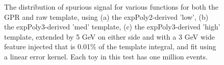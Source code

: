 \begin{figure} 
\begin{center}

\caption{The distribution of spurious signal for various functions for both the GPR and raw template, using (a) the expPoly2-derived 'low', (b) the expPoly3-derived 'med' template, (c) the expPoly3-derived 'high' template, extended by 5 GeV on either side and with a 3 GeV wide feature injected that is 0.01\% of the template integral, and fit using a linear error kernel. Each toy in this test has one million events.}
\label{fig:linearkernel_lowpt_100_Siginj}
\end{center}
\end{figure}

